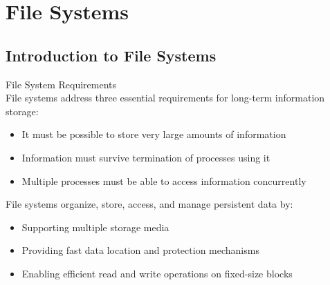 \section{File Systems}

\subsection{Introduction to File Systems}

\begin{minipage}{0.55\linewidth}
\begin{concept}{File System Requirements}\\
    File systems address three essential requirements for long-term information storage:
    \begin{itemize}
        \item It must be possible to store very large amounts of information
        \item Information must survive termination of processes using it
        \item Multiple processes must be able to access information concurrently
    \end{itemize}
    
    File systems organize, store, access, and manage persistent data by:
    \begin{itemize}
        \item Supporting multiple storage media
        \item Providing fast data location and protection mechanisms
        \item Enabling efficient read and write operations on fixed-size blocks
    \end{itemize}
\end{concept}
\end{minipage}
